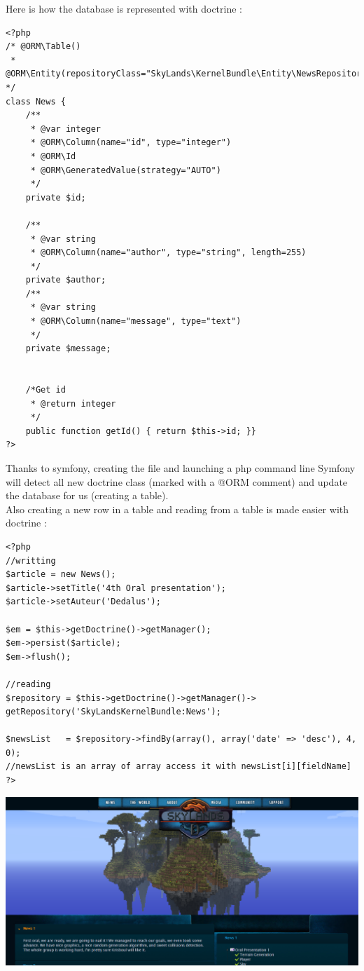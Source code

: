 \documentclass[article]{report}         %
\begin{document}
\newpage
Here is how the database is represented with doctrine :
\begin{lstlisting}
<?php
/* @ORM\Table()
 * @ORM\Entity(repositoryClass="SkyLands\KernelBundle\Entity\NewsRepository") */
class News {
    /**
     * @var integer
     * @ORM\Column(name="id", type="integer")
     * @ORM\Id
     * @ORM\GeneratedValue(strategy="AUTO")
     */
    private $id;

    /**
     * @var string
     * @ORM\Column(name="author", type="string", length=255)
     */
    private $author;
    /**
     * @var string
     * @ORM\Column(name="message", type="text")
     */
    private $message;


    /*Get id
     * @return integer 
     */
    public function getId() { return $this->id; }}
?>
\end{lstlisting}
\newpage
 		Thanks to symfony, creating the file and launching a php command line Symfony will detect all new doctrine class (marked with a @ORM comment) and update the database for us (creating a table).\\
 		Also creating a new row in a table and reading from a table is made easier with doctrine : 
\begin{lstlisting}
<?php
//writting
$article = new News();
$article->setTitle('4th Oral presentation');
$article->setAuteur('Dedalus');

$em = $this->getDoctrine()->getManager();
$em->persist($article);
$em->flush();

//reading
$repository = $this->getDoctrine()->getManager()->
getRepository('SkyLandsKernelBundle:News');

$newsList   = $repository->findBy(array(), array('date' => 'desc'), 4, 0);
//newsList is an array of array access it with newsList[i][fieldName]
?>
\end{lstlisting}

\includegraphics[width=16cm]{images/web.png}
\end{document}

